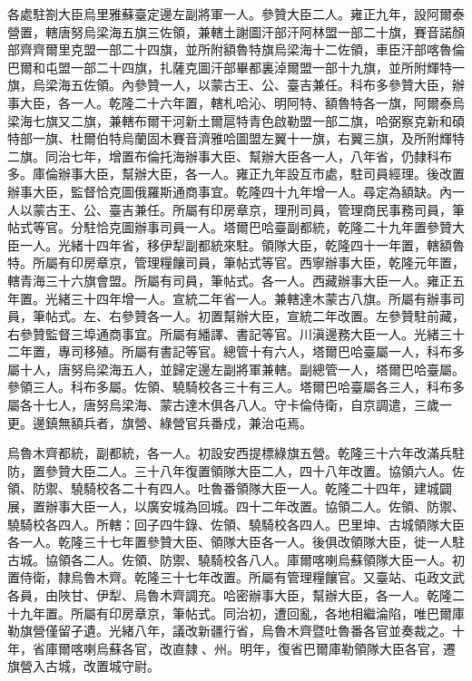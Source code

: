 \begin{pinyinscope}
各處駐劄大臣烏里雅蘇臺定邊左副將軍一人。參贊大臣二人。雍正九年，設阿爾泰營置，轄唐努烏梁海五旗三佐領，兼轄土謝圖汗部汗阿林盟一部二十旗，賽音諾顏部齊齊爾里克盟一部二十四旗，並所附額魯特旗烏梁海十二佐領，車臣汗部喀魯倫巴爾和屯盟一部二十四旗，扎薩克圖汗部畢都裏淖爾盟一部十九旗，並所附輝特一旗，烏梁海五佐領。內參贊一人，以蒙古王、公、臺吉兼任。科布多參贊大臣，辦事大臣，各一人。乾隆二十六年置，轄札哈沁、明阿特、額魯特各一旗，阿爾泰烏梁海七旗又二旗，兼轄布爾干河新土爾扈特青色啟勒盟一部二旗，哈弼察克新和碩特部一旗、杜爾伯特烏蘭固木賽音濟雅哈圖盟左翼十一旗，右翼三旗，及所附輝特二旗。同治七年，增置布倫托海辦事大臣、幫辦大臣各一人，八年省，仍隸科布多。庫倫辦事大臣，幫辦大臣，各一人。雍正九年設互市處，駐司員經理。後改置辦事大臣，監督恰克圖俄羅斯通商事宜。乾隆四十九年增一人。尋定為額缺。內一人以蒙古王、公、臺吉兼任。所屬有印房章京，理刑司員，管理商民事務司員，筆帖式等官。分駐恰克圖辦事司員一人。塔爾巴哈臺副都統，乾隆二十九年置參贊大臣一人。光緒十四年省，移伊犁副都統來駐。領隊大臣，乾隆四十一年置，轄額魯特。所屬有印房章京，管理糧饟司員，筆帖式等官。西寧辦事大臣，乾隆元年置，轄青海三十六旗會盟。所屬有司員，筆帖式。各一人。西藏辦事大臣一人。雍正五年置。光緒三十四年增一人。宣統二年省一人。兼轄達木蒙古八旗。所屬有辦事司員，筆帖式。左、右參贊各一人。初置幫辦大臣，宣統二年改置。左參贊駐前藏，右參贊監督三埠通商事宜。所屬有繙譯、書記等官。川滇邊務大臣一人。光緒三十二年置，專司移殖。所屬有書記等官。總管十有六人，塔爾巴哈臺屬一人，科布多屬十人，唐努烏梁海五人，並歸定邊左副將軍兼轄。副總管一人，塔爾巴哈臺屬。參領三人。科布多屬。佐領、驍騎校各三十有三人。塔爾巴哈臺屬各三人，科布多屬各十七人，唐努烏梁海、蒙古達木俱各八人。守卡倫侍衛，自京調遣，三歲一更。邊鎮無額兵者，旗營、綠營官兵番戍，兼治屯焉。

烏魯木齊都統，副都統，各一人。初設安西提標綠旗五營。乾隆三十六年改滿兵駐防，置參贊大臣二人。三十八年復置領隊大臣二人，四十八年改置。協領六人。佐領、防禦、驍騎校各二十有四人。吐魯番領隊大臣一人。乾隆二十四年，建城闢展，置辦事大臣一人，以廣安城為回城。四十二年改置。協領二人。佐領、防禦、驍騎校各四人。所轄：回子四牛錄、佐領、驍騎校各四人。巴里坤、古城領隊大臣各一人。乾隆三十七年置參贊大臣、領隊大臣各一人。後俱改領隊大臣，徙一人駐古城。協領各二人。佐領、防禦、驍騎校各八人。庫爾喀喇烏蘇領隊大臣一人。初置侍衛，隸烏魯木齊。乾隆三十七年改置。所屬有管理糧饟官。又臺站、屯政文武各員，由陜甘、伊犁、烏魯木齊調充。哈密辦事大臣，幫辦大臣，各一人。乾隆二十九年置。所屬有印房章京，筆帖式。同治初，遭回亂，各地相繼淪陷，唯巴爾庫勒旗營僅留孑遺。光緒八年，議改新疆行省，烏魯木齊暨吐魯番各官並奏裁之。十年，省庫爾喀喇烏蘇各官，改直隸、州。明年，復省巴爾庫勒領隊大臣各官，遷旗營入古城，改置城守尉。


\end{pinyinscope}
